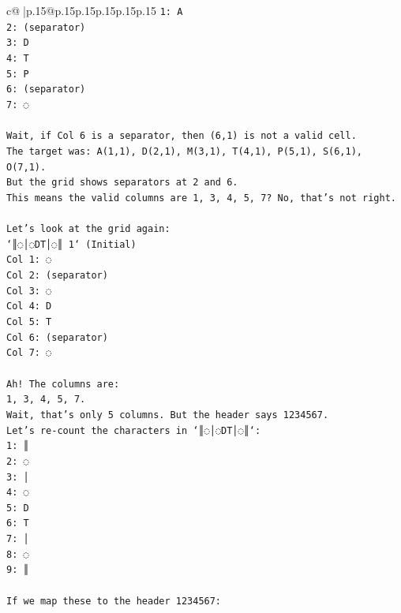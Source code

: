 \documentclass{article}
\begin{document}
{\begin{supertabular}{c@{$\;$}|p{.15\linewidth}@{}p{.15\linewidth}p{.15\linewidth}p{.15\linewidth}p{.15\linewidth}p{.15\linewidth}}
{{{\texttt{1: A} \\
\texttt{2: (separator)} \\
\texttt{3: D} \\
\texttt{4: T} \\
\texttt{5: P} \\
\texttt{6: (separator)} \\
\texttt{7: ◌} \\
\\ 
\texttt{Wait, if Col 6 is a separator, then (6,1) is not a valid cell.} \\
\texttt{The target was: A(1,1), D(2,1), M(3,1), T(4,1), P(5,1), S(6,1), O(7,1).} \\
\texttt{But the grid shows separators at 2 and 6.} \\
\texttt{This means the valid columns are 1, 3, 4, 5, 7? No, that's not right.} \\
\\ 
\texttt{Let's look at the grid again:} \\
\texttt{`║◌│◌DT│◌║ 1` (Initial)} \\
\texttt{Col 1: ◌} \\
\texttt{Col 2: (separator)} \\
\texttt{Col 3: ◌} \\
\texttt{Col 4: D} \\
\texttt{Col 5: T} \\
\texttt{Col 6: (separator)} \\
\texttt{Col 7: ◌} \\
\\ 
\texttt{Ah! The columns are:} \\
\texttt{1, 3, 4, 5, 7.} \\
\texttt{Wait, that's only 5 columns. But the header says 1234567.} \\
\texttt{Let's re{-}count the characters in `║◌│◌DT│◌║`:} \\
\texttt{1: ║} \\
\texttt{2: ◌} \\
\texttt{3: │} \\
\texttt{4: ◌} \\
\texttt{5: D} \\
\texttt{6: T} \\
\texttt{7: │} \\
\texttt{8: ◌} \\
\texttt{9: ║} \\
\\ 
\texttt{If we map these to the header 1234567:} \\
}}}
\end{supertabular}}
\end{document}
